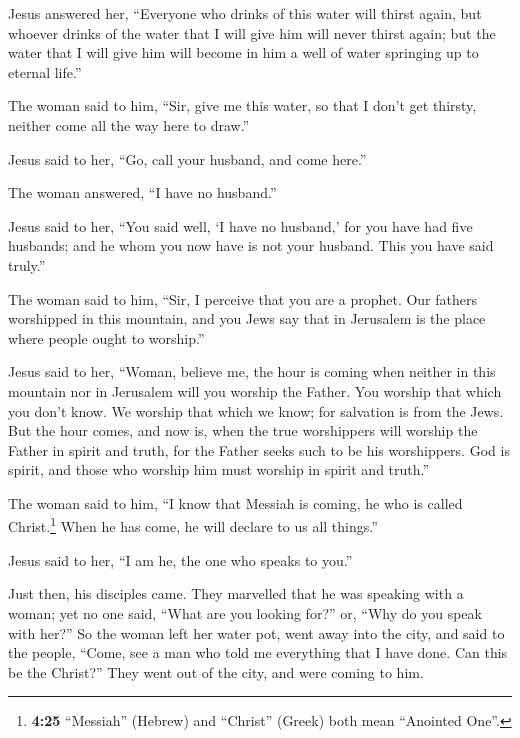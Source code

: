  Jesus answered her, ``Everyone who drinks of this water
will thirst again,  but whoever drinks of the water that
I will give him will never thirst again; but the water that I will give
him will become in him a well of water springing up to eternal life.''

 The woman said to him, ``Sir, give me this water, so
that I don't get thirsty, neither come all the way here to draw.''

 Jesus said to her, ``Go, call your husband, and come
here.''

 The woman answered, ``I have no husband.''

Jesus said to her, ``You said well, `I have no husband,' 
for you have had five husbands; and he whom you now have is not your
husband. This you have said truly.''

 The woman said to him, ``Sir, I perceive that you are a
prophet.  Our fathers worshipped in this mountain, and
you Jews say that in Jerusalem is the place where people ought to
worship.''

 Jesus said to her, ``Woman, believe me, the hour is
coming when neither in this mountain nor in Jerusalem will you worship
the Father.  You worship that which you don't know. We
worship that which we know; for salvation is from the Jews.
 But the hour comes, and now is, when the true
worshippers will worship the Father in spirit and truth, for the Father
seeks such to be his worshippers.  God is spirit, and
those who worship him must worship in spirit and truth.''

 The woman said to him, ``I know that Messiah is coming,
he who is called Christ.\footnote{\textbf{4:25} ``Messiah'' (Hebrew) and
  ``Christ'' (Greek) both mean ``Anointed One''.} When he has come, he
will declare to us all things.''

 Jesus said to her, ``I am he, the one who speaks to
you.''

 Just then, his disciples came. They marvelled that he
was speaking with a woman; yet no one said, ``What are you looking
for?'' or, ``Why do you speak with her?''  So the woman
left her water pot, went away into the city, and said to the people,
 ``Come, see a man who told me everything that I have
done. Can this be the Christ?''  They went out of the
city, and were coming to him.

